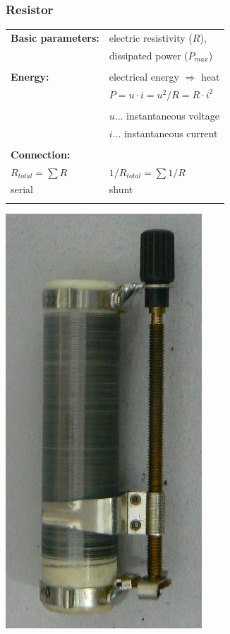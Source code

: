 \documentclass{beamer}
\begin{document}
	\begin{frame}
    \frametitle{Resistor}
		\begin{center}
		\begin{tabular}{l l}
			\textbf{Basic parameters:} 	& electric resistivity ($R$),\\
																	& dissipated power ($P_{max}$)\\ \\ \hline
			\textbf{Energy:}						& electrical energy $\Rightarrow$ heat\\
																	& $P = u\cdot i = u^2/ R = R\cdot i^2$\\\\
																	& $u$... instantaneous voltage\\
																	& $i$... instantaneous current\\\\ \hline
		  \textbf{Connection:}				& \\
			$R_{total}= \sum{R}$				& $1/R_{total}= \sum{1/R}$\\
			serial											& shunt\\\\
		\end{tabular}
		\includegraphics[scale=0.2]{obr02_potenciometr.png}
		\end{center}
  \end{frame}
	
\end{document}
